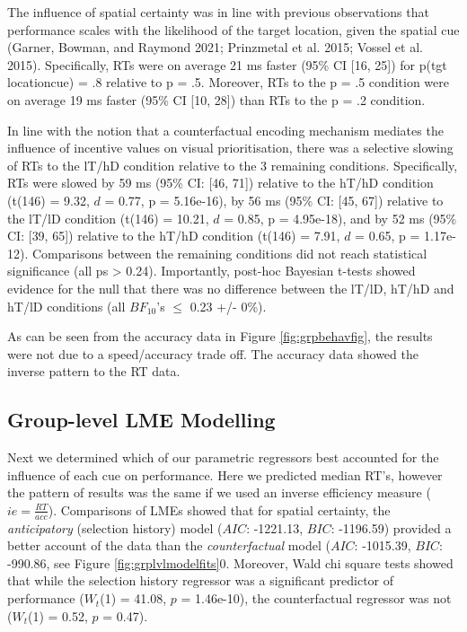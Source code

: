 \documentclass[11pt,halfline,a4paper,]{ouparticle}
\begin{document}
The influence of spatial certainty was in line with previous observations that performance scales with the likelihood of the target location, given the spatial cue (Garner, Bowman, and Raymond 2021; Prinzmetal et al. 2015; Vossel et al. 2015). Specifically, RTs were on average 21 ms faster (95\% CI {[}16, 25{]}) for p(tgt location\textbar cue) = .8 relative to p = .5. Moreover, RTs to the p = .5 condition were on average 19 ms faster (95\% CI {[}10, 28{]}) than RTs to the p = .2 condition.

In line with the notion that a counterfactual encoding mechanism mediates the influence of incentive values on visual prioritisation, there was a selective slowing of RTs to the lT/hD condition relative to the 3 remaining conditions. Specifically, RTs were slowed by 59 ms (95\% CI: {[}46, 71{]}) relative to the hT/hD condition (t(146) = 9.32, \(d\) = 0.77, p = 5.16e-16), by 56 ms (95\% CI: {[}45, 67{]}) relative to the lT/lD condition (t(146) = 10.21, \(d\) = 0.85, p = 4.95e-18), and by 52 ms (95\% CI: {[}39, 65{]}) relative to the hT/hD condition (t(146) = 7.91, \(d\) = 0.65, p = 1.17e-12). Comparisons between the remaining conditions did not reach statistical significance (all ps \textgreater{} 0.24). Importantly, post-hoc Bayesian t-tests showed evidence for the null that there was no difference between the lT/lD, hT/hD and hT/lD conditions (all \(BF_{10}\)'s \(\leq\) 0.23 +/- 0\%).

As can be seen from the accuracy data in Figure \ref{fig:grpbehavfig}, the results were not due to a speed/accuracy trade off. The accuracy data showed the inverse pattern to the RT data.

\hypertarget{group-level-lme-modelling}{%
\subsection{Group-level LME Modelling}\label{group-level-lme-modelling}}

\label{sec:GrpLvlLME}

Next we determined which of our parametric regressors best accounted for the influence of each cue on performance. Here we predicted median RT's, however the pattern of results was the same if we used an inverse efficiency measure (\(ie = \frac{RT}{acc}\)). Comparisons of LMEs showed that for spatial certainty, the \emph{anticipatory} (selection history) model (\(AIC\): -1221.13, \(BIC\): -1196.59) provided a better account of the data than the \emph{counterfactual} model (\(AIC\): -1015.39, \(BIC\): -990.86, see Figure \ref{fig:grplvlmodelfits}0. Moreover, Wald chi square tests showed that while the selection history regressor was a significant predictor of performance (\(W_{t}\)(1) = 41.08, \(p\) = 1.46e-10), the counterfactual regressor was not (\(W_{t}\)(1) = 0.52, \(p\) = 0.47).
\end{document}
